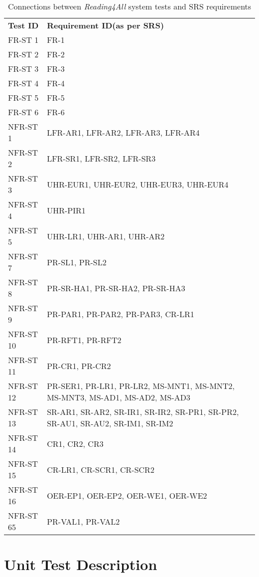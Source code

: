 \documentclass[12pt, titlepage]{article}
\begin{document}
\begin{longtable}{|p{8.0cm}|p{8.0cm}|}
  \captionsetup{justification=raggedright,singlelinecheck=false}
  \caption{Connections between \textit{Reading4All} system tests and SRS requirements}
  \label{tab:sys-tests} \\
  \toprule
  {\textbf{Test ID}} & {\textbf{Requirement ID(as per SRS)}}\\
  \midrule
  FR-ST 1 & FR-1 \\ \hline
  FR-ST 2 & FR-2 \\ \hline
  FR-ST 3 & FR-3 \\ \hline
  FR-ST 4 & FR-4 \\ \hline
  FR-ST 5 & FR-5 \\ \hline
  FR-ST 6 & FR-6 \\ \hline
  NFR-ST 1 & LFR-AR1, LFR-AR2, LFR-AR3, LFR-AR4 \\ \hline
  NFR-ST 2 & LFR-SR1, LFR-SR2, LFR-SR3 \\ \hline
  NFR-ST 3 & UHR-EUR1, UHR-EUR2, UHR-EUR3, UHR-EUR4 \\ \hline
  NFR-ST 4 & UHR-PIR1 \\ \hline
  NFR-ST 5 & UHR-LR1, UHR-AR1, UHR-AR2\\ \hline
  NFR-ST 7 & PR-SL1, PR-SL2 \\ \hline
  NFR-ST 8 & PR-SR-HA1, PR-SR-HA2, PR-SR-HA3 \\ \hline
  NFR-ST 9 & PR-PAR1, PR-PAR2, PR-PAR3, CR-LR1 \\ \hline
  NFR-ST 10 & PR-RFT1, PR-RFT2 \\ \hline
  NFR-ST 11 & PR-CR1, PR-CR2 \\ \hline
  NFR-ST 12 & PR-SER1, PR-LR1, PR-LR2, MS-MNT1, MS-MNT2, MS-MNT3, MS-AD1, MS-AD2, MS-AD3 \\ \hline
  NFR-ST 13 & SR-AR1, SR-AR2, SR-IR1, SR-IR2, SR-PR1, SR-PR2, SR-AU1, SR-AU2, SR-IM1, SR-IM2 \\ \hline
  NFR-ST 14 & CR1, CR2, CR3 \\ \hline
  NFR-ST 15 & CR-LR1, CR-SCR1, CR-SCR2 \\ \hline
  NFR-ST 16 & OER-EP1, OER-EP2, OER-WE1, OER-WE2 \\ \hline
  NFR-ST 65 & PR-VAL1, PR-VAL2 \\ \hline
  \bottomrule
\end{longtable}

\section{Unit Test Description}
\label{Unit Test Desc}
\end{document}
